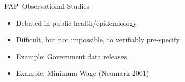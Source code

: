 \documentclass{beamer}
\begin{document}
{ %
    \begin{frame}[plain]
     \end{frame}
}
\begin{frame}{PAP--Observational Studies}
\begin{itemize}[<.->]
\item Debated in public health/epidemiology.
\item Difficult, but not impossible, to verifiably pre-specify.
\item Example: Government data releases
\item Example: Minimum Wage (Neumark 2001)
\end{itemize}
\end{frame}
\end{document}
